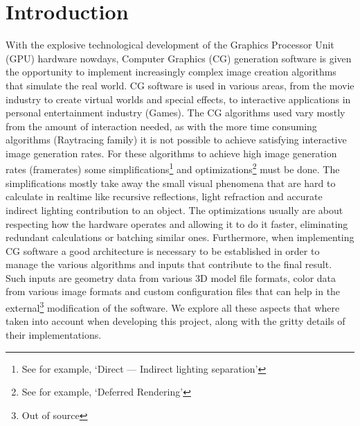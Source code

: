 \section{Introduction}
With the explosive technological development of the Graphics Processor Unit (GPU) hardware nowdays,
Computer Graphics (CG) generation software is given the opportunity to implement increasingly complex image
creation algorithms that simulate the real world. CG software is used in various areas, from the movie
industry to create virtual worlds and special effects, to interactive applications in personal entertainment
industry (Games). The CG algorithms used vary mostly from the amount of interaction needed, as with the more
time consuming algorithms (Raytracing family) it is not possible to achieve satisfying interactive image
generation rates. For these algorithms to achieve high image generation rates (framerates) some
simplifications\footnote{See for example, `Direct --- Indirect lighting separation'} and optimizations\footnote{See
for example, `Deferred Rendering'} must be done. The simplifications mostly take away the small visual phenomena
that are hard to calculate in realtime like recursive reflections, light refraction and accurate indirect lighting
contribution to an object. The optimizations usually are about respecting how the hardware operates and allowing
it to do it faster, eliminating redundant calculations or batching similar ones. Furthermore, when implementing CG
software a good architecture is necessary to be established in order to manage the various algorithms and inputs
that contribute to the final result. Such inputs are geometry data from various 3D model file formats, color data
from various image formats and custom configuration files that can help in the external\footnote{Out of source}
modification of the software. We explore all these aspects that where taken into account when developing this
project, along with the gritty details of their implementations.
